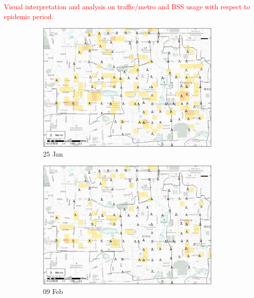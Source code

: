 \documentclass[preprints,ijgi,submit,moreauthors]{Definitions/mdpi}
\begin{document}
\textcolor{red}{Visual interpretation and analysis on traffic/metro and BSS usage with respect to epidemic period.}
\begin{figure}[H]
    \centering
    \begin{subfigure}{.23\textwidth}
        \includegraphics[width=\textwidth]{Figures/Figure10/POI_metroD2020_01_25.eps}
        \caption{25 Jan}
    \end{subfigure}
    \begin{subfigure}{.23\textwidth}
        \includegraphics[width=\textwidth]{Figures/Figure10/POI_metroD2020_02_09.eps}
        \caption{09 Feb}
    \end{subfigure}
    \begin{subfigure}{.23\textwidth}

\end{subfigure}
\end{figure}
\end{document}

